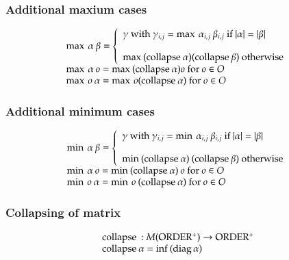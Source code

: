 \subsubsection{Additional maxium cases}
\[
\begin{array}{ll}
\operatorname{max}\: \alpha \: \beta =  \left\{ \begin{array}{l}
                          \gamma \mbox{ with } \gamma_{i,j} = \operatorname{max}\: \alpha_{i,j} \: \beta_{i,j} \mbox{ if } \vert\alpha\vert = \vert\beta\vert \\
\\
                          \operatorname{max}\: (\mathrm{collapse}\: \alpha) (\mathrm{collapse}\: \beta) \mbox{ otherwise}  
                          \end{array}\right. \\
\operatorname{max}\: \alpha \: o = \operatorname{max}\: (\mathrm{collapse}\: \alpha) o \mbox{ for } o \in O\\
\operatorname{max}\: o \: \alpha = \operatorname{max}\: o (\mathrm{collapse}\: \alpha) \mbox{ for } o \in O\\
\end{array}
\]

\subsubsection{Additional minimum cases}
\[
\begin{array}{ll}
\operatorname{min}\: \alpha  \: \beta =  \left\{ \begin{array}{l}
                          \gamma \mbox{ with } \gamma_{i,j} = \operatorname{min}\: \alpha_{i,j} \: \beta_{i,j} \mbox{ if } \vert\alpha\vert = \vert\beta\vert \\
\\  
                        \operatorname{min}\: (\mathrm{collapse}\: \alpha) \: (\mathrm{collapse}\: \beta) \mbox{ otherwise}  
                          \end{array}\right. \\
\operatorname{min}\: \alpha \: o = \operatorname{min}\: (\mathrm{collapse}\: \alpha) \: o \mbox{ for } o \in O\\
\operatorname{min}\: o \: \alpha = \operatorname{min}\: o \: (\mathrm{collapse}\: \alpha) \mbox{ for } o \in O\\
\end{array}
\]

\subsubsection{Collapsing of matrix}
\[
\begin{array}{ll}
\multicolumn{2}{l}{\coll : M(\opl) \ra \opl}\\
\coll \alpha = \info (\diag \alpha) 
\end{array}
\]

